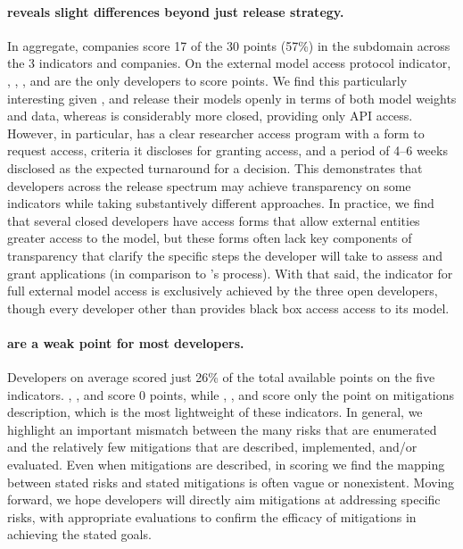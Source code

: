 \paragraph{\modelaccess reveals slight differences beyond just release strategy.}
In aggregate, companies score 17 of the 30 points (57\%) in the \modelaccess subdomain across the 3 indicators and \numcompanies companies.
On the external model access protocol indicator, \meta, \huggingface, \openai, and \stability are the only developers to score points.
We find this particularly interesting given \meta, \huggingface and \stability release their models openly in terms of both model weights and data, whereas \openai is considerably more closed, providing only API access.
However, in particular, \openai has a clear researcher access program with a form to request access, criteria it discloses for granting access, and a period of 4--6 weeks disclosed as the expected turnaround for a decision.
This demonstrates that developers across the release spectrum \citep{solaiman2023gradient} may achieve transparency on some indicators while taking substantively different approaches.
In practice, we find that several closed developers have access forms that allow external entities greater access to the model, but these forms often lack key components of transparency that clarify the specific steps the developer will take to assess and grant applications (\eg in comparison to \openai's process).
With that said, the indicator for full external model access is exclusively achieved by the three open developers, though every developer other than \inflection provides black box access access to its model.


\paragraph{\modelmitigations are a weak point for most developers.} 
Developers on average scored just 26\% of the total available points on the five \modelmitigations indicators. 
\huggingface, \stability, and \aitwentyone score 0 points, while \cohere, \inflection, and \amazon score only the point on mitigations description, which is the most lightweight of these indicators. 
In general, we highlight an important mismatch between the many risks that are enumerated and the relatively few mitigations that are described, implemented, and/or evaluated.
Even when mitigations are described, in scoring we find the mapping between stated risks and stated mitigations is often vague or nonexistent. 
Moving forward, we hope developers will directly aim mitigations at addressing specific risks, with appropriate evaluations to confirm the efficacy of mitigations in achieving the stated goals. 


